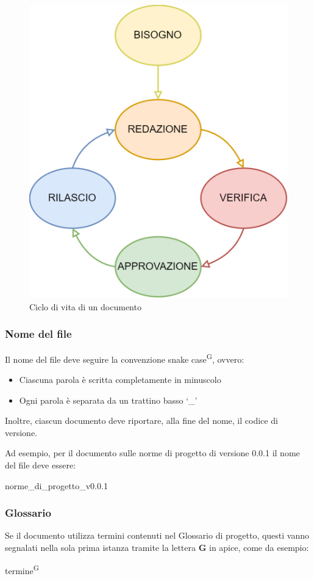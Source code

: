 \begin{figure}[H]
    \centering
    \includegraphics[scale=0.8]{doc_lifecycle.png}
    \caption{Ciclo di vita di un documento}
    \label{fig:doc_lifecycle}
\end{figure}
\subsubsection{Nome del file}
Il nome del file deve seguire la convenzione snake case\textsuperscript{G}, ovvero:
\begin{itemize}
    \item Ciascuna parola è scritta completamente in minuscolo
    \item Ogni parola è separata da un trattino basso `\_'
\end{itemize}
Inoltre, ciascun documento deve riportare, alla fine del nome, il codice di versione.
\par Ad esempio, per il documento sulle norme di progetto di versione 0.0.1 il nome del file deve essere:
\begin{center}
    norme\_di\_progetto\_v0.0.1
\end{center}
\subsubsection{Glossario}
Se il documento utilizza termini contenuti nel Glossario di progetto, questi vanno segnalati nella sola prima istanza tramite la lettera \textbf{G} in apice, come da esempio:
\begin{center}
    termine\textsuperscript{G}
\end{center}
